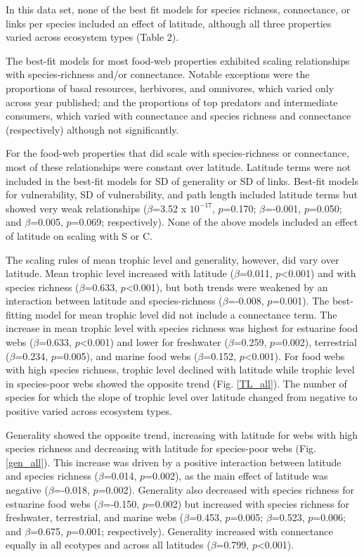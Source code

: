 \documentclass[12pt]{article}
\begin{document}
In this data set, none of the best fit models for species richness, connectance, or links per species included an 
effect of latitude, although all three properties varied across ecosystem types (Table 2). 


The best-fit models for most food-web properties exhibited scaling relationships with species-richness and/or 
connectance. Notable exceptions were the proportions of basal resources, herbivores, and omnivores, which varied only 
across year published; and the proportions of top predators and intermediate consumers, which varied with connectance 
and species richness and connectance (respectively) although not significantly.


For the food-web properties that did scale with species-richness or connectance, most of these relationships were 
constant over latitude. Latitude terms were not included in the best-fit models for SD of generality or 
SD of links. Best-fit models for vulnerability, SD of vulnerability, and path length included latitude terms but showed 
very weak relationships ($\beta$=3.52 x $10^{-17}$, $p$=0.170; $\beta$=-0.001, $p$=0.050; and $\beta$=0.005, $p$=0.069; 
respectively). None of the above models included an effect of latitude on scaling with S or C.


The scaling rules of mean trophic level and generality, however, did vary over latitude. 
Mean trophic level increased with latitude ($\beta$=0.011, $p$<0.001) and with species richness 
($\beta$=0.633, $p$<0.001), but both trends were weakened by an interaction between latitude and species-richness 
($\beta$=-0.008, $p$=0.001). The best-fitting model for mean trophic 
level did not include a connectance term. The increase in mean trophic level with species richness was highest for 
estuarine food webs ($\beta$=0.633, $p$<0.001) and lower for freshwater ($\beta$=0.259, $p$=0.002), terrestrial 
($\beta$=0.234, $p$=0.005), and marine food webs ($\beta$=0.152, $p$<0.001). For food webs with high species richness, 
trophic level declined with latitude while trophic level in species-poor webs showed the opposite trend 
(Fig. \ref{TL_all}). The number of species for which the slope of trophic level over latitude changed from negative to 
positive varied across ecosystem types.


Generality showed the opposite trend, increasing with latitude for webs with high species richness and decreasing with
latitude for species-poor webs (Fig. \ref{gen_all}).
This increase was driven by a positive interaction between latitude and species richness ($\beta$=0.014, $p$=0.002), as 
the main effect of latitude was negative ($\beta$=-0.018, $p$=0.002). Generality also decreased with species richness 
for estuarine food webs ($\beta$=-0.150, $p$=0.002) but increased with species richness for freshwater, terrestrial, 
and marine webs ($\beta$=0.453, $p$=0.005; $\beta$=0.523, $p$=0.006; and $\beta$=0.675, $p$=0.001; respectively). 
Generality increased with connectance equally in all ecotypes and across all latitudes ($\beta$=0.799, $p$<0.001).
\end{document}
